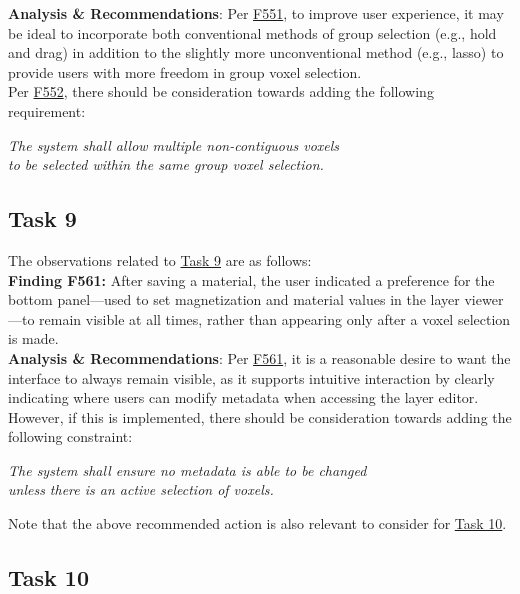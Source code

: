 \documentclass{article}
\begin{document}
\noindent \textbf{Analysis \& Recommendations}:
Per \hyperlink{finding:F551}{F551}, to improve user experience, it may be ideal to incorporate both conventional methods of group selection (e.g., hold and drag) in addition to the slightly more unconventional method (e.g., lasso) to provide users with more freedom in group voxel selection.\\

\noindent Per \hyperlink{finding:F552}{F552}, there should be consideration towards adding the following requirement:

\begin{center}
    \textit{The system shall allow multiple non-contiguous voxels}\\
    \textit{to be selected within the same group voxel selection.}
  \end{center}
  
\subsection{Task 9}

\noindent The observations related to \hyperlink{task:T9}{Task 9} are as follows:\\

\noindent \hypertarget{finding:F561}{\textbf{Finding F561:}} 
After saving a material, the user indicated a preference for the bottom panel—used to set magnetization and material values in the layer viewer—to remain visible at all times, rather than appearing only after a voxel selection is made. \\

\noindent \textbf{Analysis \& Recommendations}:
Per \hyperlink{finding:F561}{F561}, it is a reasonable desire to want the interface to always remain visible, as it supports intuitive interaction by clearly indicating where users can modify metadata when accessing the layer editor. However, if this is implemented, there should be consideration towards adding the following constraint: 

\begin{center}
    \textit{The system shall ensure no metadata is able to be changed }\\
    \textit{unless there is an active selection of voxels.}
\end{center}

\noindent Note that the above recommended action is also relevant to consider for \hyperlink{task:T10}{Task 10}.


\subsection{Task 10}
\end{document}
